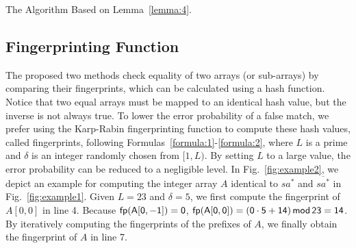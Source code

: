 \documentclass[10pt,journal,compsoc]{IEEEtran}
\begin{document}
\begin{algorithm*}

	\caption{The Algorithm Based on Lemma~\ref{lemma:4}.}
	
	\label{alg:3}
	
\end{algorithm*}


\subsection{Fingerprinting Function}

The proposed two methods check equality of two arrays (or sub-arrays) by comparing their fingerprints, which can be calculated using a hash function. Notice that two equal arrays must be mapped to an identical hash value, but the inverse is not always true. To lower the error probability of a false match, we prefer using the Karp-Rabin fingerprinting function to compute these hash values, called fingerprints,	 following Formulas~\ref{formula:1}-\ref{formula:2}, where $L$ is a prime and $\delta$ is an integer randomly chosen from $[1, L)$. By setting $L$ to a large value, the error probability can be reduced to a negligible level. In Fig.~\ref{fig:example2}, we depict an example for computing the integer array $A$ identical to $sa^*$ and $\overline{sa^*}$ in Fig.~\ref{fig:example1}. Given $L = 23$ and $\delta = 5$, we first compute the fingerprint of $A[0, 0]$ in line 4. Because $\sf fp(A[0, -1]) = 0$, $\sf fp(A[0, 0]) = (0 \cdot 5 + 14) \, mod \, 23 = 14$. By iteratively computing the fingerprints of the prefixes of $A$, we finally obtain the fingerprint of $A$ in line 7.
\end{document}
